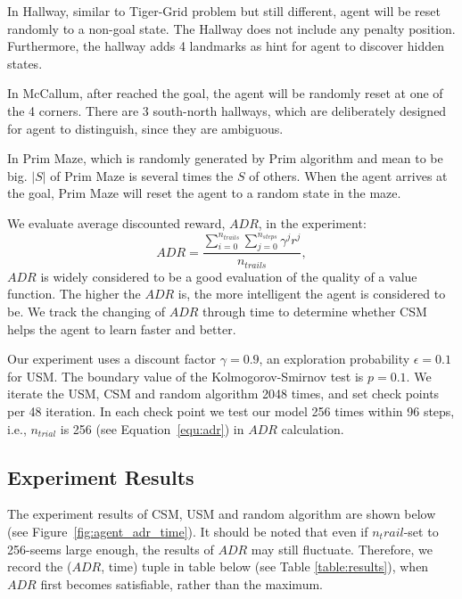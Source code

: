 \documentclass{article}
\begin{document}
In Hallway, similar to Tiger-Grid problem but still different, agent will be reset randomly
to a non-goal state. The Hallway does not include any penalty position. Furthermore, the hallway
adds 4 landmarks as hint for agent to discover hidden states.

In McCallum, after reached the goal, the agent will be randomly reset at one of the 4 corners.
There are 3 south-north hallways, which are deliberately designed for agent to distinguish, since
they are ambiguous. 

In Prim Maze, which is randomly generated by Prim algorithm and mean to be big. $|S|$ of Prim Maze
is several times the $S$ of others. When the agent arrives at the goal, Prim Maze will reset
the agent to a random state in the maze.

We evaluate average discounted reward, $ADR$, in the experiment:
\begin{equation}
  ADR = \frac{\sum_{i=0}^{n_{trails}} \sum_{j=0}^{n_{steps}} \gamma^j r^j}{n_{trails}}, \label{equ:adr}
\end{equation}
$ADR$ is widely considered to be a good evaluation of the quality of a value function. The higher
the $ADR$ is, the more intelligent the agent is considered to be. We track the changing of $ADR$ through time
to determine whether CSM helps the agent to learn faster and better.
  
Our experiment uses a discount factor $\gamma=0.9$, an exploration probability $\epsilon=0.1$ for USM.
The boundary value of the Kolmogorov-Smirnov test is $p=0.1$. We iterate the USM, CSM and random algorithm
2048 times, and set check points per 48 iteration. In each check point we test our model 256 times
within 96 steps, i.e., $n_{trial}$ is 256 (see Equation~\ref{equ:adr}) in $ADR$ calculation.

\subsection{Experiment Results}

The experiment results of CSM, USM and random algorithm are shown below (see Figure~\ref{fig:agent_adr_time}).
It should be noted that even if $n_trail$-set to 256-seems large enough, the results of $ADR$ may still fluctuate.
Therefore, we record the ($ADR$, time) tuple in table below (see Table \ref{table:results}), when $ADR$ first
becomes satisfiable, rather than the maximum.
\end{document}
